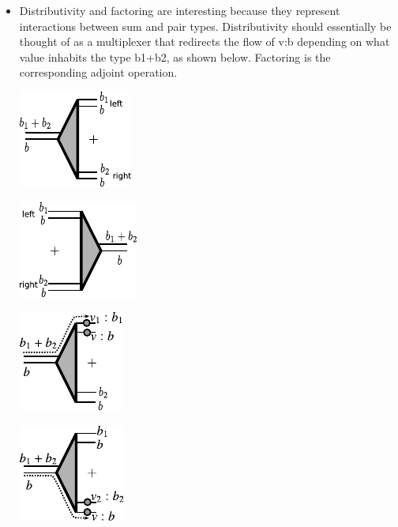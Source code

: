 \documentclass{llncs}
\begin{document}
\begin{itemize}
\item Distributivity and factoring are interesting because they
  represent interactions between sum and pair types. Distributivity
  should essentially be thought of as a multiplexer that redirects the
  flow of {{v:b}} depending on what value inhabits the type {{b1+b2}},
  as shown below. Factoring is the corresponding adjoint operation.

\begin{multicols}{4}
\begin{center}
  \includegraphics{diagrams/thesis/dist.pdf}
\end{center}
\begin{center}
  \includegraphics{diagrams/thesis/factor.pdf}
\end{center}
\begin{center}
  \includegraphics{diagrams/thesis/dist-wire-value1.pdf}
\end{center}
\begin{center}
  \includegraphics{diagrams/thesis/dist-wire-value2.pdf}
\end{center}
\end{multicols}




\end{itemize}
\end{document}
